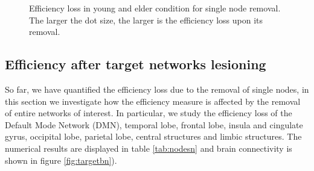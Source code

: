 \documentclass[12pt,a4paper]{article}
\begin{document}
\begin{figure}[H]
    \hfill
    \caption{Efficiency loss in young and elder condition for single node removal. The larger the dot size, the larger is the efficiency loss upon its removal.} 
    \label{fig:effloss}
  \end{figure} 


\subsection{Efficiency after target networks lesioning}
\label{ss:target}
So far, we have quantified the efficiency loss due to the removal of single nodes, in this section we investigate how the efficiency measure is affected by the removal of entire networks of interest. In particular, we study the efficiency loss of the Default Mode Network (DMN), temporal lobe, frontal lobe, insula and cingulate gyrus, occipital lobe, parietal lobe, central structures and limbic structures. The numerical results are displayed in table \ref{tab:nodesn} and brain connectivity is shown in figure \ref{fig:targetbn}).
 
\end{document}
